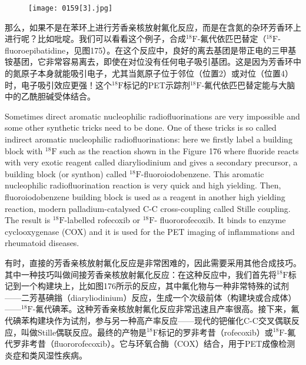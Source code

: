\documentclass[dvipsnames, svgnames,a4paper,11pt]{article}
\begin{document}
\begin{figure}[h]
	\centering
    \texttt{[image: 0159[3].jpg]}    
     \label{fig175}
\end{figure}

那么，如果不是在苯环上进行芳香亲核放射氟化反应，而是在含氮的杂环芳香环上进行呢？比如吡啶。我们可以看看这个例子，合成${}^\mathrm{18}\mathrm{F}$-氟代依匹巴替定（${}^\mathrm{18}\mathrm{F}$-fluoroepibatidine，见图175）。在这个反应中，良好的离去基团是带正电的三甲基铵基团，它非常容易离去，即使在对位没有任何电子吸引基团。这是因为芳香环中的氮原子本身就能吸引电子，尤其当氮原子位于邻位（位置2）或对位（位置4）时，电子吸引效应更强！这个${}^\mathrm{18}\mathrm{F}$标记的PET示踪剂${}^\mathrm{18}\mathrm{F}$-氟代依匹巴替定能与大脑中的乙酰胆碱受体结合。



Sometimes direct aromatic nucleophilic radiofluorinations are very impossible and
some other synthetic tricks need to be done. One of these tricks is so called indirect
aromatic nucleophilic radiofluorinations: here we firstly label a building block with ${}^\mathrm{18}\mathrm{F}$
such as the reaction shown in the Figure 176 where fluoride reacts with very exotic
reagent called diaryliodinium and gives a secondary precursor, a building block (or
synthon) called ${}^\mathrm{18}\mathrm{F}$-fluoroiodobenzene. This aromatic nucleophilic radiofluorination
reaction is very quick and high yielding. Then, fluoroiodobenzene building block is
used as a reagent in another high yielding reaction, modern palladium-catalysed C-C
cross-coupling called Stille coupling. The result is ${}^\mathrm{18}\mathrm{F}$-labelled rofecoxib or ${}^\mathrm{18}\mathrm{F}$-
fluororofecoxib. It binds to enzyme cyclooxygenase (COX) and it is used for the PET
imaging of inflammations and rheumatoid diseases.

有时，直接的芳香亲核放射氟化反应是非常困难的，因此需要采用其他合成技巧。其中一种技巧叫做间接芳香亲核放射氟化反应：在这种反应中，我们首先将${}^\mathrm{18}\mathrm{F}$标记到一个构建块上，比如图176所示的反应，其中氟化物与一种非常特殊的试剂——二芳基碘鎓（diaryliodinium）反应，生成一个次级前体（构建块或合成体）——${}^\mathrm{18}\mathrm{F}$-氟代碘苯。这种芳香亲核放射氟化反应非常迅速且产率很高。接下来，氟代碘苯构建块作为试剂，参与另一种高产率反应——现代的钯催化C-C交叉偶联反应，叫做Stille偶联反应。最终的产物是${}^\mathrm{18}\mathrm{F}$标记的罗非考昔（rofecoxib）或${}^\mathrm{18}\mathrm{F}$-氟代罗非考昔（fluororofecoxib）。它与环氧合酶（COX）结合，用于PET成像检测炎症和类风湿性疾病。
\end{document}
